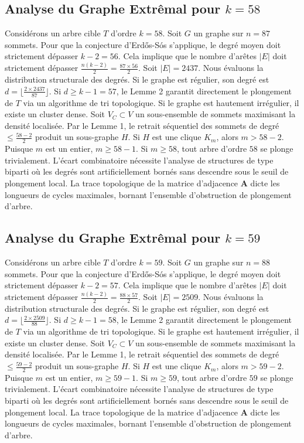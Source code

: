 \documentclass[11pt,a4paper]{article}
\begin{document}
\subsection{Analyse du Graphe Extr\^emal pour $k=58$}
Consid\'erons un arbre cible $T$ d'ordre $k=58$.
Soit $G$ un graphe sur $n=87$ sommets.
Pour que la conjecture d'Erd\H{o}s-S\'os s'applique, le degr\'e moyen doit strictement d\'epasser $k-2 = 56$.
Cela implique que le nombre d'ar\^etes $|E|$ doit strictement d\'epasser $\frac{n(k-2)}{2} = \frac{87 \times 56}{2}$.
Soit $|E| = 2437$.
Nous \'evaluons la distribution structurale des degr\'es. Si le graphe est r\'egulier, son degr\'e est $d = \lfloor \frac{2 \times 2437}{87} \rfloor$.
Si $d \geq k-1 = 57$, le Lemme 2 garantit directement le plongement de $T$ via un algorithme de tri topologique.
Si le graphe est hautement irr\'egulier, il existe un cluster dense. Soit $V_C \subset V$ un sous-ensemble de sommets maximisant la densit\'e localis\'ee.
Par le Lemme 1, le retrait s\'equentiel des sommets de degr\'e $\leq \frac{58-2}{2}$ produit un sous-graphe $H$.
Si $H$ est une clique $K_{m}$, alors $m > 58-2$. Puisque $m$ est un entier, $m \geq 58-1$. Si $m \geq 58$, tout arbre d'ordre $58$ se plonge trivialement.
L'\'ecart combinatoire n\'ecessite l'analyse de structures de type biparti o\`u les degr\'es sont artificiellement born\'es sans descendre sous le seuil de plongement local. La trace topologique de la matrice d'adjacence $\mathbf{A}$ dicte les longueurs de cycles maximales, bornant l'ensemble d'obstruction de plongement d'arbre.


\subsection{Analyse du Graphe Extr\^emal pour $k=59$}
Consid\'erons un arbre cible $T$ d'ordre $k=59$.
Soit $G$ un graphe sur $n=88$ sommets.
Pour que la conjecture d'Erd\H{o}s-S\'os s'applique, le degr\'e moyen doit strictement d\'epasser $k-2 = 57$.
Cela implique que le nombre d'ar\^etes $|E|$ doit strictement d\'epasser $\frac{n(k-2)}{2} = \frac{88 \times 57}{2}$.
Soit $|E| = 2509$.
Nous \'evaluons la distribution structurale des degr\'es. Si le graphe est r\'egulier, son degr\'e est $d = \lfloor \frac{2 \times 2509}{88} \rfloor$.
Si $d \geq k-1 = 58$, le Lemme 2 garantit directement le plongement de $T$ via un algorithme de tri topologique.
Si le graphe est hautement irr\'egulier, il existe un cluster dense. Soit $V_C \subset V$ un sous-ensemble de sommets maximisant la densit\'e localis\'ee.
Par le Lemme 1, le retrait s\'equentiel des sommets de degr\'e $\leq \frac{59-2}{2}$ produit un sous-graphe $H$.
Si $H$ est une clique $K_{m}$, alors $m > 59-2$. Puisque $m$ est un entier, $m \geq 59-1$. Si $m \geq 59$, tout arbre d'ordre $59$ se plonge trivialement.
L'\'ecart combinatoire n\'ecessite l'analyse de structures de type biparti o\`u les degr\'es sont artificiellement born\'es sans descendre sous le seuil de plongement local. La trace topologique de la matrice d'adjacence $\mathbf{A}$ dicte les longueurs de cycles maximales, bornant l'ensemble d'obstruction de plongement d'arbre.
\end{document}
